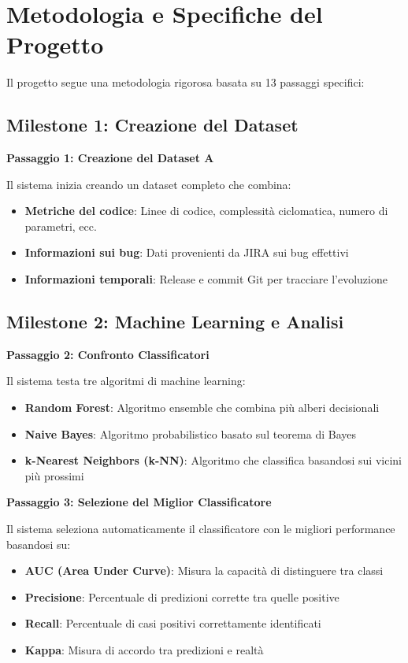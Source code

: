 \documentclass[12pt,a4paper]{article}
\begin{document}
\section{Metodologia e Specifiche del Progetto}

Il progetto segue una metodologia rigorosa basata su 13 passaggi specifici:

\subsection{Milestone 1: Creazione del Dataset}

\textbf{Passaggio 1: Creazione del Dataset A}

Il sistema inizia creando un dataset completo che combina:
\begin{itemize}
    \item \textbf{Metriche del codice}: Linee di codice, complessità ciclomatica, numero di parametri, ecc.
    \item \textbf{Informazioni sui bug}: Dati provenienti da JIRA sui bug effettivi
    \item \textbf{Informazioni temporali}: Release e commit Git per tracciare l'evoluzione
\end{itemize}

\subsection{Milestone 2: Machine Learning e Analisi}

\textbf{Passaggio 2: Confronto Classificatori}

Il sistema testa tre algoritmi di machine learning:
\begin{itemize}
    \item \textbf{Random Forest}: Algoritmo ensemble che combina più alberi decisionali
    \item \textbf{Naive Bayes}: Algoritmo probabilistico basato sul teorema di Bayes
    \item \textbf{k-Nearest Neighbors (k-NN)}: Algoritmo che classifica basandosi sui vicini più prossimi
\end{itemize}

\textbf{Passaggio 3: Selezione del Miglior Classificatore}

Il sistema seleziona automaticamente il classificatore con le migliori performance basandosi su:
\begin{itemize}
    \item \textbf{AUC (Area Under Curve)}: Misura la capacità di distinguere tra classi
    \item \textbf{Precisione}: Percentuale di predizioni corrette tra quelle positive
    \item \textbf{Recall}: Percentuale di casi positivi correttamente identificati
    \item \textbf{Kappa}: Misura di accordo tra predizioni e realtà
\end{itemize}
\end{document}
